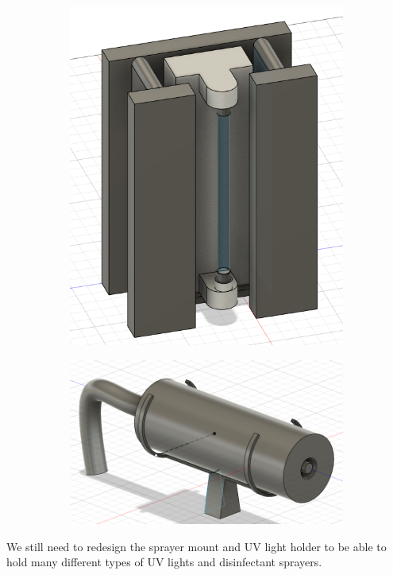 \documentclass[fontsize=11pt, %
                             paper=a4, %
                             twoside, %
                             captions=tableheading,
                             index=totoc,
                             hyperref]{labbook}
\begin{document}
\begin{addmargin}[0cm]{0cm}
\begin{figure}[H]
\begin{subfigure}{.5\textwidth}
\end{subfigure}
\begin{subfigure}{.5\textwidth}
\centering
\includegraphics[scale=0.3]{figs/img/v2UVLampConveyor}
\end{subfigure}
\begin{subfigure}{.5\textwidth}
\centering
\includegraphics[scale=0.3]{figs/img/v2SprayerMount}
\end{subfigure}
\end{figure}
We still need to redesign the sprayer mount and UV light holder to be able to hold many different types of UV lights and disinfectant sprayers.
\end{addmargin} 
\end{document}
